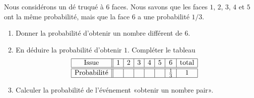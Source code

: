 
\begin{exercice}\label{exosmath-0355}

Nous considérons un dé truqué à \( 6\) faces. Nous savons que les faces \( 1\), \( 2\), \( 3\), \( 4\) et \( 5\) ont la même probabilité, mais que la face \( 6\) a une probabilité \( 1/3\).

\begin{enumerate}
    \item
        Donner la probabilité d'obtenir un nombre différent de \( 6\).       
    \item
        En déduire la probabilité d'obtenir \( 1\). Compléter le tableau
        \begin{equation*}
            \begin{array}[]{|c||c|c|c|c|c|c|c|}
                \hline
                \text{Issue}&1&2&3&4&5&6&\text{total}\\
                \hline\hline
                \text{Probabilité}&&&&&&\frac{1}{ 3 }&1\\
                \hline
            \end{array}
        \end{equation*}
    \item
        Calculer la probabilité de l'événement «obtenir un nombre pair».
\end{enumerate}



\end{exercice}
